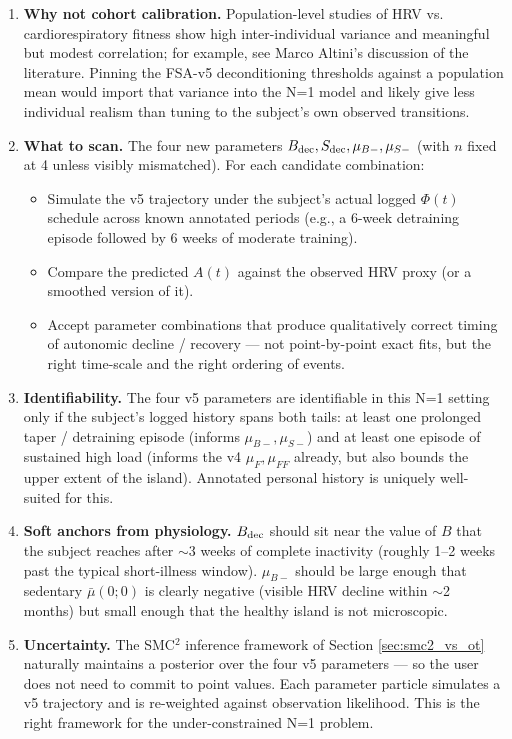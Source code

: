 \begin{enumerate}
  \item \textbf{Why not cohort calibration.} Population-level studies of HRV vs. cardiorespiratory fitness show high inter-individual variance and meaningful but modest correlation; for example, see Marco Altini's discussion of the literature. Pinning the FSA-v5 deconditioning thresholds against a population mean would import that variance into the N=1 model and likely give less individual realism than tuning to the subject's own observed transitions.
  \item \textbf{What to scan.} The four new parameters $B_{\rm dec}, S_{\rm dec}, \mu_{B-}, \mu_{S-}$ (with $n$ fixed at 4 unless visibly mismatched). For each candidate combination:
    \begin{itemize}
      \item Simulate the v5 trajectory under the subject's actual logged $\Phi(t)$ schedule across known annotated periods (e.g., a 6-week detraining episode followed by 6 weeks of moderate training).
      \item Compare the predicted $A(t)$ against the observed HRV proxy (or a smoothed version of it).
      \item Accept parameter combinations that produce qualitatively correct timing of autonomic decline / recovery --- not point-by-point exact fits, but the right time-scale and the right ordering of events.
    \end{itemize}
  \item \textbf{Identifiability.} The four v5 parameters are identifiable in this N=1 setting only if the subject's logged history spans both tails: at least one prolonged taper / detraining episode (informs $\mu_{B-}, \mu_{S-}$) and at least one episode of sustained high load (informs the v4 $\mu_F, \mu_{FF}$ already, but also bounds the upper extent of the island). Annotated personal history is uniquely well-suited for this.
  \item \textbf{Soft anchors from physiology.} $B_{\rm dec}$ should sit near the value of $B$ that the subject reaches after $\sim 3$ weeks of complete inactivity (roughly 1--2 weeks past the typical short-illness window). $\mu_{B-}$ should be large enough that sedentary $\bar\mu(0;0)$ is clearly negative (visible HRV decline within $\sim$2 months) but small enough that the healthy island is not microscopic.
  \item \textbf{Uncertainty.} The SMC$^2$ inference framework of Section \ref{sec:smc2_vs_ot} naturally maintains a posterior over the four v5 parameters --- so the user does not need to commit to point values. Each parameter particle simulates a v5 trajectory and is re-weighted against observation likelihood. This is the right framework for the under-constrained N=1 problem.
\end{enumerate}


